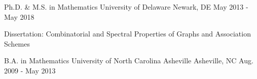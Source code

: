 \begin{cventries}
  \cventry
    {Ph.D. \& M.S. in Mathematics}
    {University of Delaware}
    {Newark, DE}
    {May 2013 - May 2018}
    {
      \begin{cvitems}
        \item {Dissertation: Combinatorial and Spectral Properties of Graphs and Association Schemes}
      \end{cvitems}
    }
  \cventry
    {B.A. in Mathematics}
    {University of North Carolina Asheville}
    {Asheville, NC}
    {Aug. 2009 - May 2013}
    {}
\end{cventries}
\vspace*{-4pt}
